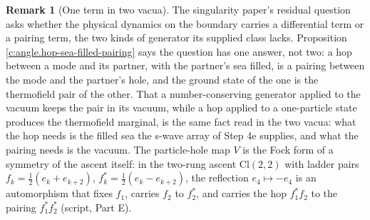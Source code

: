 \documentclass[11pt]{article}
\theoremstyle{definition}
\newtheorem{remark}[theorem]{Remark}
\theoremstyle{plain}
\providecommand{\Cl}{}\renewcommand{\Cl}{\mathrm{Cl}}
\begin{document}
\begin{remark}[One term in two vacua]\label{c:note.angle.one-term-two-vacua}
The singularity paper's residual question asks whether the physical dynamics on the boundary carries a differential term or a pairing term, the two kinds of generator its supplied class lacks. Proposition \ref{c:angle.hop-sea-filled-pairing} says the question has one answer, not two: a hop between a mode and its partner, with the partner's sea filled, is a pairing between the mode and the partner's hole, and the ground state of the one is the thermofield pair of the other. That a number-conserving generator applied to the vacuum keeps the pair in its vacuum, while a hop applied to a one-particle state produces the thermofield marginal, is the same fact read in the two vacua: what the hop needs is the filled sea the s-wave array of Step 4e supplies, and what the pairing needs is the vacuum. The particle-hole map $V$ is the Fock form of a symmetry of the ascent itself: in the two-rung ascent $\Cl(2,2)$ with ladder pairs $f_{k} = \tfrac12(e_{k} + e_{k+2})$, $f_{k}^{*} = \tfrac12(e_{k} - e_{k+2})$, the reflection $e_{4} \mapsto -e_{4}$ is an automorphism that fixes $f_{1}$, carries $f_{2}$ to $f_{2}^{*}$, and carries the hop $f_{1}^{*}f_{2}$ to the pairing $f_{1}^{*}f_{2}^{*}$ (script, Part E).
\end{remark}
\end{document}
